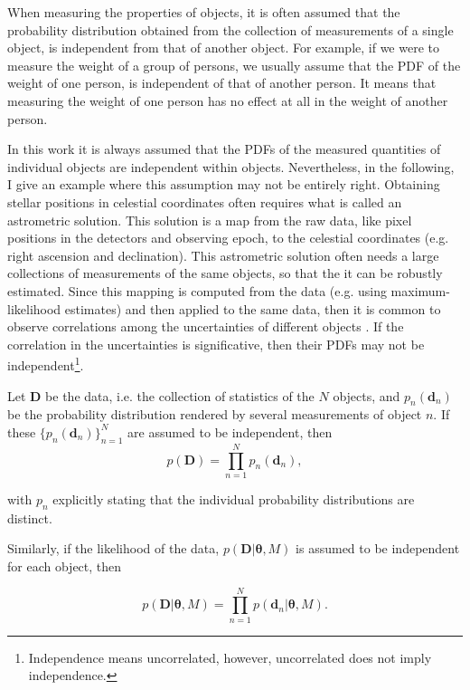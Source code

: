 When measuring the properties of objects, it is often assumed that the probability distribution obtained from the collection of measurements of a single object, is independent from that of another object. For example, if we were to measure the weight of a group of persons, we usually assume that the PDF of the weight of one person, is independent of that of another person. It means that measuring the weight of one person has no effect at all in the weight of another person.

{\color{red}
In this work it is always assumed that the PDFs of the measured quantities of individual objects are independent within objects. Nevertheless, in the following, I give an example where this assumption may not be entirely right. Obtaining stellar positions in celestial coordinates often requires what is called an astrometric solution. This solution is a map from the raw data, like pixel positions in the detectors and observing epoch, to the celestial coordinates (e.g. right ascension and declination). This astrometric solution often needs a large collections of measurements of the same objects, so that the it can be robustly estimated. Since this mapping is computed from the data (e.g. using maximum-likelihood estimates) and then applied to the same data, then it is common to observe correlations among the uncertainties of different objects \cite[see for example][]{2010IAUS..261..320H,2017A&A...601A..19G}. If the correlation in the uncertainties is significative, then their PDFs may not be independent\footnote{Independence means uncorrelated, however, uncorrelated does not imply independence.}.  
}

Let $\mathbf{D}$ be the data, i.e. the collection of statistics of the $N$ objects, and $p_n(\mathbf{d}_n)$ be the probability distribution rendered by several measurements of object $n$. If these $\{p_n(\mathbf{d}_n)\}_{n=1}^N$ are assumed to be independent, then
\begin{equation}
\label{eq:independence}
 p(\mathbf{D}) = \prod_{n=1}^N p_n(\mathbf{d}_n),
\end{equation}

 with $p_n$ explicitly stating that the individual probability distributions are distinct. 
 
Similarly, if the likelihood of the data, $p(\mathbf{D}|\boldsymbol{\theta},M)$ is assumed to be independent for each object, then

\begin{equation}
\label{eq:lik_datum}
 p(\mathbf{D}|\boldsymbol{\theta},M) = \prod_{n=1}^N p(\mathbf{d}_n|\boldsymbol{\theta},M).
\end{equation}

